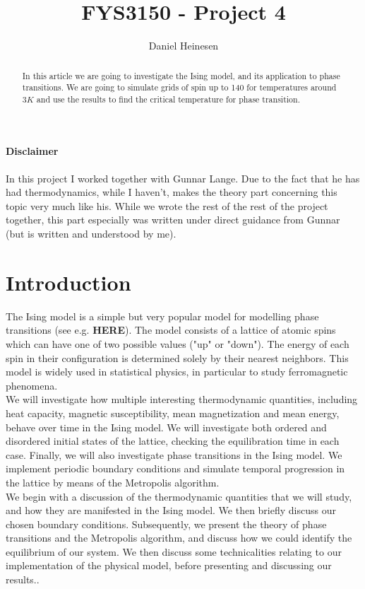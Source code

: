 \documentclass[a4paper, 10pt]{article}
\title{FYS3150 - Project 4}
\author{Daniel Heinesen}
\begin{document}
\maketitle

\paragraph*{Disclaimer}
In this project I worked together with Gunnar Lange. Due to the fact that he has had thermodynamics, while I haven't, makes the theory part concerning this topic very much like his. While we wrote the rest of the rest of the project together, this part especially was written under direct guidance from Gunnar (but is written and understood by me).

\begin{abstract}
In this article we are going to investigate the Ising model, and its application to phase transitions. We are going to simulate grids of spin up to 140 for temperatures around $3K$ and use the results to find the critical temperature for phase transition.
\end{abstract}
\tableofcontents
\section{Introduction}
The Ising model is a simple but very popular model for modelling phase transitions (see e.g. \textbf{HERE}). The model consists of a lattice of atomic spins which can have one of two possible values ("up" or "down"). The energy of each spin in their configuration is determined solely by their nearest neighbors. This model is widely used in statistical physics, in particular to study ferromagnetic phenomena.\\
\linebreak
We will investigate how multiple interesting thermodynamic quantities, including heat capacity, magnetic susceptibility, mean magnetization and mean energy, behave over time in the Ising model. We will investigate both ordered and disordered initial states of the lattice, checking the equilibration time in each case. Finally, we will also investigate phase transitions in the Ising model. We implement periodic boundary conditions and simulate temporal progression in the lattice by means of the Metropolis algorithm.\\
\linebreak
We begin with a discussion of the thermodynamic quantities that we will study, and how they are manifested in the Ising model. We then briefly discuss our chosen boundary conditions. Subsequently, we present the theory of phase transitions and the Metropolis algorithm, and discuss how we could identify the equilibrium of our system. We then discuss some technicalities relating to our implementation of the physical model, before presenting and discussing our results..
\end{document}
